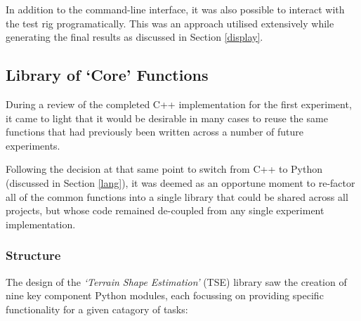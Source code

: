 In addition to the command-line interface, it was also possible to interact with the test rig programatically. This was an approach utilised extensively while generating the final results as discussed in Section \ref{display}.

%


\subsection{Library of `Core' Functions}

During a review of the completed C++ implementation for the first experiment, it came to light that it would be desirable in many cases to reuse the same functions that had previously been written across a number of future experiments. 

Following the decision at that same point to switch from C++ to Python (discussed in Section \ref{lang}), it was deemed as an opportune moment to re-factor all of the common functions into a single library that could be shared across all projects, but whose code remained de-coupled from any single experiment implementation. 

\subsubsection{Structure}

The design of the \textit{`Terrain Shape Estimation'} (TSE) library saw the creation of nine key component Python modules, each focussing on providing specific functionality for a given catagory of tasks:

